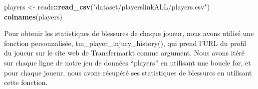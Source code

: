 \documentclass[
]{article}
\newenvironment{Shaded}{\begin{snugshade}}{\end{snugshade}}
\newcommand{\AttributeTok}[1]{\textcolor[rgb]{0.13,0.29,0.53}{#1}}
\newcommand{\ConstantTok}[1]{\textcolor[rgb]{0.56,0.35,0.01}{#1}}
\newcommand{\ControlFlowTok}[1]{\textcolor[rgb]{0.13,0.29,0.53}{\textbf{#1}}}
\newcommand{\DecValTok}[1]{\textcolor[rgb]{0.00,0.00,0.81}{#1}}
\newcommand{\FunctionTok}[1]{\textcolor[rgb]{0.13,0.29,0.53}{\textbf{#1}}}
\newcommand{\NormalTok}[1]{#1}
\newcommand{\OtherTok}[1]{\textcolor[rgb]{0.56,0.35,0.01}{#1}}
\newcommand{\SpecialCharTok}[1]{\textcolor[rgb]{0.81,0.36,0.00}{\textbf{#1}}}
\newcommand{\StringTok}[1]{\textcolor[rgb]{0.31,0.60,0.02}{#1}}
\begin{document}
\begin{Shaded}
\begin{Highlighting}[]
\NormalTok{players }\OtherTok{\textless{}{-}}\NormalTok{ readr}\SpecialCharTok{::}\FunctionTok{read\_csv}\NormalTok{(}\StringTok{"dataset/playerslinkALL/players.csv"}\NormalTok{)}
\FunctionTok{colnames}\NormalTok{(players)}
\end{Highlighting}
\end{Shaded}

Pour obtenir les statistiques de blessures de chaque joueur, nous avons
utilisé une fonction personnalisée, tm\_player\_injury\_history(), qui
prend l'URL du profil du joueur sur le site web de Transfermarkt comme
argument. Nous avons itéré sur chaque ligne de notre jeu de données
``players'' en utilisant une boucle for, et pour chaque joueur, nous
avons récupéré ses statistiques de blessures en utilisant cette
fonction.

\begin{Shaded}
\end{Shaded}
\end{document}
